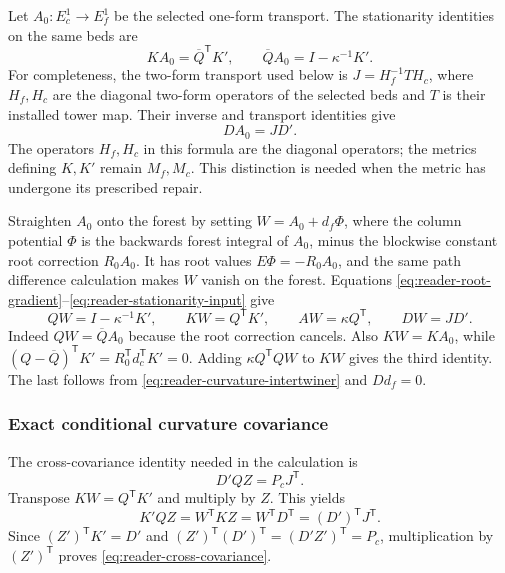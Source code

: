 Let $A_0:E_c^1\to E_f^1$ be the selected one-form transport.
The stationarity identities on the same beds are
\begin{equation}\label{eq:reader-stationarity-input}
 KA_0=\overline Q^{\mathsf T}K',\qquad
 \overline QA_0=I-\kappa^{-1}K'.
\end{equation}
For completeness, the two-form transport used below is
$J=H_f^{-1}T H_c$, where $H_f,H_c$ are the diagonal two-form
operators of the selected beds and $T$ is their installed tower
map. Their inverse and transport identities give
\begin{equation}\label{eq:reader-curvature-intertwiner}
 DA_0=JD'.
\end{equation}
The operators $H_f,H_c$ in this formula are the diagonal operators;
the metrics defining $K,K'$ remain $M_f,M_c$. This distinction is
needed when the metric has undergone its prescribed repair.

Straighten $A_0$ onto the forest by setting $W=A_0+d_f\Phi$, where
the column potential $\Phi$ is the backwards forest integral of
$A_0$, minus the blockwise constant root correction $R_0A_0$.
It has root values $E\Phi=-R_0A_0$, and the same path difference
calculation makes $W$ vanish on the forest. Equations
\eqref{eq:reader-root-gradient}--\eqref{eq:reader-stationarity-input}
give
\begin{equation}\label{eq:reader-stationary-slice}
 QW=I-\kappa^{-1}K',\qquad KW=Q^{\mathsf T}K',
 \qquad AW=\kappa Q^{\mathsf T},\qquad DW=JD'.
\end{equation}
Indeed $QW=\overline QA_0$ because the root correction cancels.
Also $KW=KA_0$, while
$(Q-\overline Q)^{\mathsf T}K'=R_0^{\mathsf T}d_c^{\mathsf T}K'=0$.
Adding $\kappa Q^{\mathsf T}QW$ to $KW$ gives the third identity.
The last follows from \eqref{eq:reader-curvature-intertwiner} and
$Dd_f=0$.

\subsubsection{Exact conditional curvature covariance}

The cross-covariance identity needed in the calculation is
\begin{equation}\label{eq:reader-cross-covariance}
 D'QZ=P_cJ^{\mathsf T}.
\end{equation}
Transpose $KW=Q^{\mathsf T}K'$ and multiply by $Z$. This yields
\[
 K'QZ=W^{\mathsf T}KZ=W^{\mathsf T}D^{\mathsf T}
       =(D')^{\mathsf T}J^{\mathsf T}.
\]
Since $(Z')^{\mathsf T}K'=D'$ and
$(Z')^{\mathsf T}(D')^{\mathsf T}=(D'Z')^{\mathsf T}=P_c$,
multiplication by $(Z')^{\mathsf T}$ proves
\eqref{eq:reader-cross-covariance}.

